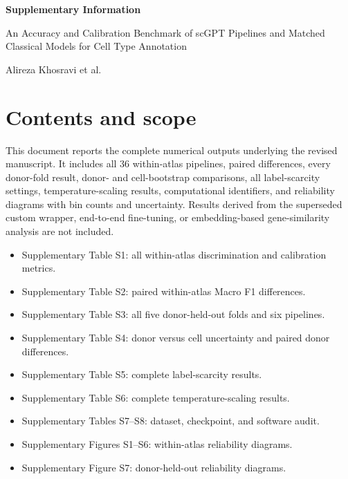 \documentclass[11pt,a4paper]{article}
\begin{document}
\begin{center}
{\Large\bfseries Supplementary Information\par}
\vspace{8pt}
{\large An Accuracy and Calibration Benchmark of scGPT Pipelines and Matched Classical Models for Cell Type Annotation\par}
\vspace{8pt}
Alireza Khosravi et al.
\end{center}

\section*{Contents and scope}

This document reports the complete numerical outputs underlying the revised manuscript. It includes all 36 within-atlas pipelines, paired differences, every donor-fold result, donor- and cell-bootstrap comparisons, all label-scarcity settings, temperature-scaling results, computational identifiers, and reliability diagrams with bin counts and uncertainty. Results derived from the superseded custom wrapper, end-to-end fine-tuning, or embedding-based gene-similarity analysis are not included.

\begin{itemize}
\item Supplementary Table S1: all within-atlas discrimination and calibration metrics.
\item Supplementary Table S2: paired within-atlas Macro F1 differences.
\item Supplementary Table S3: all five donor-held-out folds and six pipelines.
\item Supplementary Table S4: donor versus cell uncertainty and paired donor differences.
\item Supplementary Table S5: complete label-scarcity results.
\item Supplementary Table S6: complete temperature-scaling results.
\item Supplementary Tables S7--S8: dataset, checkpoint, and software audit.
\item Supplementary Figures S1--S6: within-atlas reliability diagrams.
\item Supplementary Figure S7: donor-held-out reliability diagrams.
\end{itemize}



\clearpage

\end{document}
